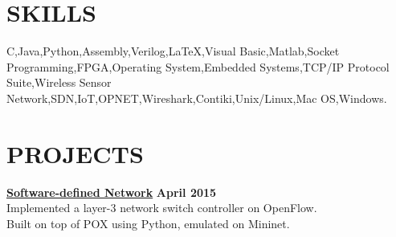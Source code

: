 \documentclass[margin,line]{resume}
\begin{document}
\begin{resume}
\sectionline

    \section{\mysidestyle \textbf{\large{S}\small{KILLS}}}

    C,\hspace{2mm}Java,\hspace{2mm}Python,\hspace{2mm}Assembly,\hspace{2mm}Verilog,\hspace{2mm}\LaTeX,\hspace{2mm}Visual Basic,\hspace{2mm}Matlab,\hspace{2mm}Socket Programming,\hspace{2mm}FPGA,\hspace{2mm}Operating System,\hspace{2mm}Embedded Systems,\hspace{2mm}TCP/IP Protocol Suite,\hspace{2mm}Wireless Sensor Network,\hspace{2mm}SDN,\hspace{2mm}IoT,\hspace{2mm}OPNET,\hspace{2mm}Wireshark,\hspace{2mm}Contiki,\hspace{2mm}Unix/Linux,\hspace{2mm}Mac OS,\hspace{2mm}Windows.

\sectionline

    \section{\mysidestyle \textbf{\large{P}\small{ROJECTS}}}

    \textbf{\listing \href{https://github.com/bmyfish/OpenFlow_L3_Learning_Switch}{Software-defined Network}} \hfill \textbf{April 2015}\vspace{2mm}\\
    Implemented a layer-3 network switch controller on OpenFlow.\\
    Built on top of POX using Python, emulated on Mininet.     


\end{resume}
\end{document}
